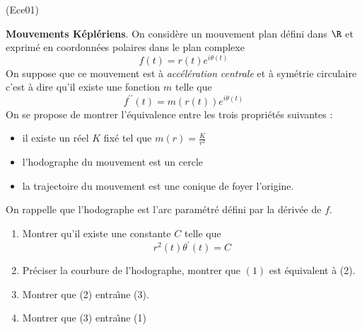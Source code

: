 \begin{tiny}(Ece01)\end{tiny}
\textbf{Mouvements K{\'e}pl{\'e}riens}. On consid{\`e}re un mouvement
plan d{\'e}fini dans $\R$ et exprim{\'e} en coordonn{\'e}es polaires
dans le plan complexe
\[
f(t)=r(t)e^{i\theta (t)}
\]
On suppose que ce mouvement est {\`a} \emph{acc{\'e}l{\'e}ration} \emph{%
centrale} et {\`a} sym{\'e}trie circulaire c'est {\`a} dire qu'il existe une
fonction $m$ telle que
\[
f^{\prime \prime }(t)=m(r(t))e^{i\theta (t)}
\]
On se propose de montrer l'{\'e}quivalence entre les trois
propri{\'e}t{\'e}s suivantes :

\begin{itemize}
\item  il existe un r{\'e}el $K$ fix{\'e} tel que $m(r)=\frac{K}{r^{2}}$

\item  l'hodographe du mouvement est un cercle

\item  la trajectoire du mouvement est une conique de foyer
l'origine.
\end{itemize}

On rappelle que l'hodographe est l'arc param{\'e}tr{\'e} d{\'e}fini par la
d{\'e}riv{\'e}e de $f$.

\begin{enumerate}
\item  Montrer qu'il existe une constante $C$ telle que
\[
r^{2}(t)\theta ^{\prime }(t)=C
\]

\item  Pr{\'e}ciser la courbure de l'hodographe, montrer que $(1)$ est
{\'e}quivalent {\`a} (2).

\item  Montrer que (2) entra{\^\i}ne (3).

\item  Montrer que (3) entra{\^\i}ne (1)
\end{enumerate}
